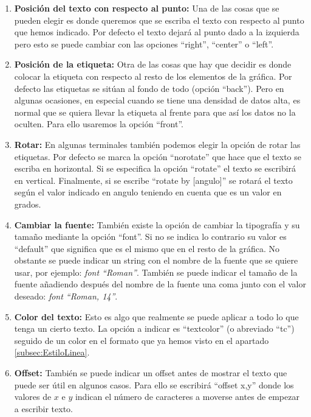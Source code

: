 \documentclass[11pt,a4paper,twoside,pdf]{article}
\numberwithin{equation}{section}
\begin{document}
\begin{enumerate}
    \item \textbf{Posición del texto con respecto al punto:} Una de las cosas que se pueden elegir es donde queremos que se escriba el texto con respecto al punto que hemos indicado. Por defecto el texto dejará al punto dado a la izquierda pero esto se puede cambiar con las opciones ``right'', ``center'' o ``left''.
    \item \textbf{Posición de la etiqueta:} Otra de las cosas que hay que decidir es donde colocar la etiqueta con respecto al resto de los elementos de la gráfica. Por defecto las etiquetas se sitúan al fondo de todo (opción ``back''). Pero en algunas ocasiones, en especial cuando se tiene una densidad de datos alta, es normal que se quiera llevar la etiqueta al frente para que así los datos no la oculten. Para ello usaremos la opción ``front''.
    \item \textbf{Rotar:} En algunas terminales también podemos elegir la opción de rotar las etiquetas. Por defecto se marca la opción ``norotate'' que hace que el texto se escriba en horizontal. Si se especifica la opción ``rotate'' el texto se escribirá en vertical. Finalmente, si se escribe ``rotate by [angulo]'' se rotará el texto según el valor indicado en angulo teniendo en cuenta que es un valor en grados.
    \item \textbf{Cambiar la fuente:} También existe la opción de cambiar la tipografía y su tamaño mediante la opción ``font''. Si no se indica lo contrario su valor es ``default'' que significa que es el mismo que en el resto de la gráfica. No obstante se puede indicar un string con el nombre de la fuente que se quiere usar, por ejemplo: \textit{font ``Roman''}. También se puede indicar el tamaño de la fuente añadiendo después del nombre de la fuente una coma junto con el valor deseado: \textit{font ``Roman, 14''}.
    \item \textbf{Color del texto:} Esto es algo que realmente se puede aplicar a todo lo que tenga un cierto texto. La opción a indicar es ``textcolor'' (o abreviado ``tc'') seguido de un color en el formato que ya hemos visto en el apartado \ref{subsec:EstiloLinea}.
    \item \textbf{Offset:} También se puede indicar un offset antes de mostrar el texto que puede ser útil en algunos casos. Para ello se escribirá ``offset x,y'' donde los valores de $x$ e $y$ indican el número de caracteres a moverse antes de empezar a escribir texto.
\end{enumerate}
\end{document}
